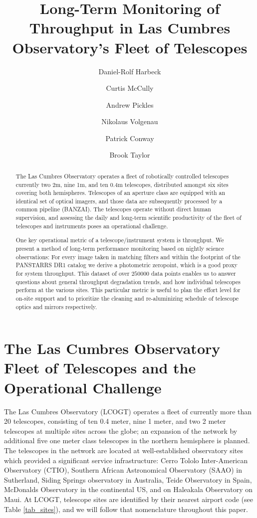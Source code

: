 \documentclass[draft]{spieman}
\title{Long-Term Monitoring of Throughput in Las Cumbres Observatory's Fleet of Telescopes}
\author[a]{Daniel-Rolf Harbeck}
\author[a]{Curtis McCully}
\author[a]{Andrew Pickles}
\author[a]{Nikolaus Volgenau}
\author[a,b]{Patrick Conway}
\author[a]{Brook Taylor}
\affil[a] {Las Cumbres Observatory, Goleta, CA (USA)}
\affil[b] {Telescope Technologies Limited, Liverpool, UK}
\begin{document}
\maketitle

\begin{abstract}
The Las Cumbres Observatory operates a fleet of robotically controlled telescopes currently two 2m,
nine 1m, and ten 0.4m telescopes, distributed amongst six sites covering both hemispheres.
Telescopes of an aperture class are equipped with an identical set of optical imagers, and those
data are subsequently processed by a common pipeline (BANZAI). The telescopes operate without direct
human supervision, and assessing the daily and long-term scientific productivity of the fleet of
telescopes and instruments poses an operational challenge.

One key operational metric of a telescope/instrument system is throughput. We present a method of
long-term performance monitoring based on nightly science observations: For every image taken in
matching filters and within the footprint of the PANSTARRS DR1 catalog we derive a photometric
zeropoint, which is a good proxy for system throughput. This dataset of over $250000$ data points
enables us to answer questions about general throughput degradation trends, and how individual
telescopes perform at the various sites. This particular metric is useful to plan the effort level
for on-site support and to prioritize the cleaning and re-aluminizing schedule of telescope optics
and mirrors respectively.
\end{abstract}


\section{The Las Cumbres Observatory Fleet of Telescopes and the Operational Challenge}

The Las Cumbres Observatory (LCOGT) operates a fleet of currently more than 20 telescopes,
consisting of ten 0.4 meter, nine 1 meter, and two 2 meter telescopes at multiple sites across the
globe\cite{brown2013}; an expansion of the network by additional five one meter class telescopes in
the northern hemisphere is planned. The telescopes in the network are located at well-established
observatory sites which provided a significant service infrastructure: Cerro Tololo Inter-American
Observatory (CTIO), Southern African Astronomical Observatory (SAAO) in Sutherland, Siding Springs
observatory in Australia, Teide Observatory in Spain, McDonalds Observatory in the continental US,
and on Haleakala Observatory on Maui. At LCOGT, telescope sites are identified by their nearest
airport code (see Table \ref{tab_sites}), and we will follow that nomenclature throughout this
paper.
\end{document}

